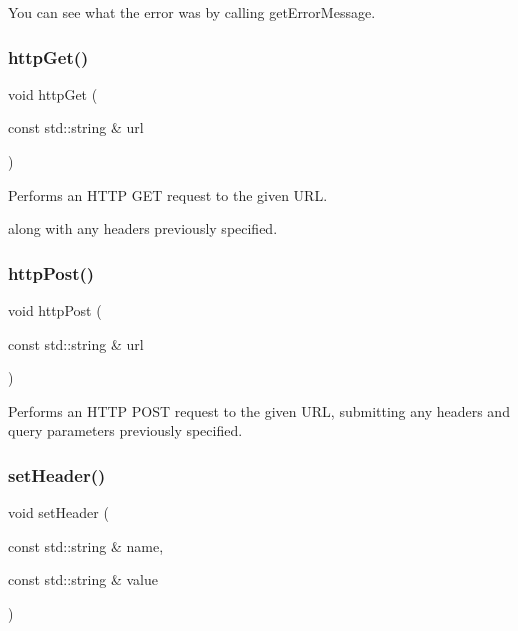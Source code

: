 You can see what the error was by calling get\+Error\+Message. \mbox{\label{classsgl_1_1GDownloader_a4bafb98a98bc6edc2403a3734c985618}} 
\subsubsection{\texorpdfstring{http\+Get()}{httpGet()}}
{\footnotesize\ttfamily void http\+Get (\begin{DoxyParamCaption}\item[{const std\+::string \&}]{url }\end{DoxyParamCaption})}



Performs an H\+T\+TP G\+ET request to the given U\+RL. 

along with any headers previously specified. \mbox{\label{classsgl_1_1GDownloader_a68ec0a089bf1b625b86753545e952a57}} 
\subsubsection{\texorpdfstring{http\+Post()}{httpPost()}}
{\footnotesize\ttfamily void http\+Post (\begin{DoxyParamCaption}\item[{const std\+::string \&}]{url }\end{DoxyParamCaption})}



Performs an H\+T\+TP P\+O\+ST request to the given U\+RL, submitting any headers and query parameters previously specified. 

\mbox{\label{classsgl_1_1GDownloader_af7065da3945b84ffb547b8bad9ddf8dc}} 
\subsubsection{\texorpdfstring{set\+Header()}{setHeader()}}
{\footnotesize\ttfamily void set\+Header (\begin{DoxyParamCaption}\item[{const std\+::string \&}]{name,  }\item[{const std\+::string \&}]{value }\end{DoxyParamCaption})}

